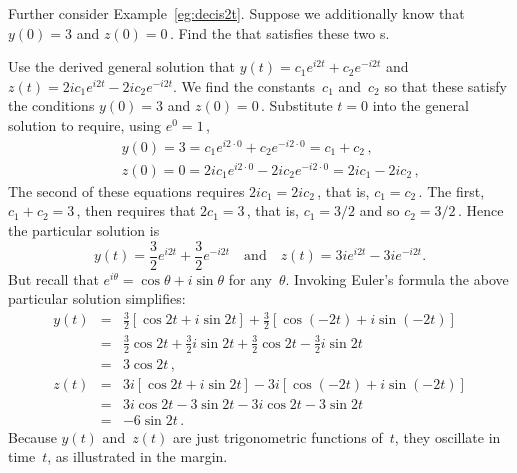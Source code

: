 \begin{example} \label{eg:decis2tb} 
Further consider Example~\ref{eg:decis2t}.
Suppose we additionally know that \(y(0)=3\) and \(z(0)=0\)\,.  
Find the  that satisfies these two s.
\begin{solution} 
Use the derived general solution that \(y(t)=c_1e^{i2t}+c_2e^{-i2t}\) and \(z(t)=2ic_1e^{i2t}-2ic_2e^{-i2t}\).
We find the constants~\(c_1\) and~\(c_2\) so that these satisfy the  conditions \(y(0)=3\) and \(z(0)=0\)\,.
Substitute \(t=0\) into the general solution to require, using \(e^0=1\)\,,
\begin{eqnarray*}
&&y(0)=3=c_1e^{i2\cdot0}+c_2e^{-i2\cdot0}=c_1+c_2\,,
\\&&z(0)=0=2ic_1e^{i2\cdot0}-2ic_2e^{-i2\cdot0}=2ic_1-2ic_2\,,
\end{eqnarray*}
The second of these equations requires \(2ic_1=2ic_2\)\,, that is, \(c_1=c_2\)\,.
The first, \(c_1+c_2=3\)\,, then requires that \(2c_1=3\)\,, that is, \(c_1=3/2\) and so \(c_2=3/2\)\,.
Hence the particular solution is
\begin{equation*}
y(t)=\frac32e^{i2t}+\frac32e^{-i2t} 
\quad\text{and}\quad
z(t)=3ie^{i2t}-3ie^{-i2t}.
\end{equation*}
But recall  that \(e^{i\theta}=\cos\theta+i\sin\theta\) for any~\(\theta\).
Invoking Euler's formula the above particular solution simplifies:
%
\begin{eqnarray*}
y(t)&=&\frac32[\cos2t+i\sin2t]+\frac32[\cos(-2t)+i\sin(-2t)]
\\&=&\frac32\cos2t+\frac32i\sin2t+\frac32\cos2t-\frac32i\sin2t
\\&=&3\cos2t\,,
\\z(t)&=&3i[\cos2t+i\sin2t]-3i[\cos(-2t)+i\sin(-2t)]
\\&=&3i\cos2t-3\sin2t-3i\cos2t-3\sin2t
\\&=&-6\sin2t\,.
\end{eqnarray*}
Because \(y(t)\) and~\(z(t)\) are just trigonometric functions of~\(t\), they oscillate in time~\(t\), as illustrated in the margin.
\end{solution}
\end{example}



